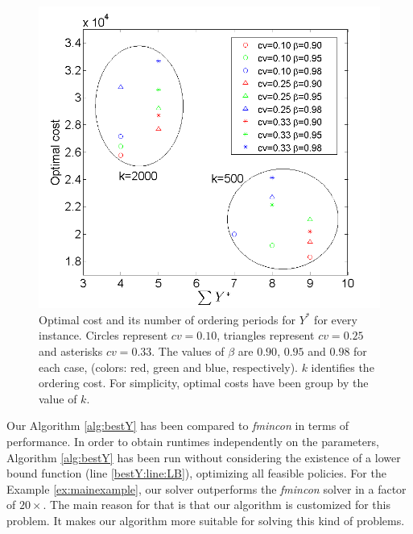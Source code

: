 {\begin{figure}[!ht]
\centering
\includegraphics[scale=0.3]{iccsa2015/figures/experimentos.png}
\caption{Optimal cost and its number of ordering periods for $Y^*$ for every instance. Circles represent $cv=0.10$, triangles represent $cv=0.25$ and asterisks $cv=0.33$. The values of $\beta$ are $0.90$, $0.95$ and $0.98$ for each case, (colors: red, green and blue, respectively). $k$ identifies the ordering cost. For simplicity, optimal costs have been group by the value of $k$.}
\label{fig:tests}
\end{figure}





Our Algorithm \ref{alg:bestY} has been compared to \emph{fmincon} in terms of performance. In order to obtain runtimes independently on the parameters, Algorithm \ref{alg:bestY} has been run without considering the existence of a lower bound function (line \ref{bestY:line:LB}), optimizing all feasible policies. For the Example \ref{ex:mainexample}, our solver
outperforms the \emph{fmincon} solver in a factor of $20\times$. The main reason for that is that our algorithm is customized for this problem. It makes our algorithm more suitable for solving this kind of problems.

}
